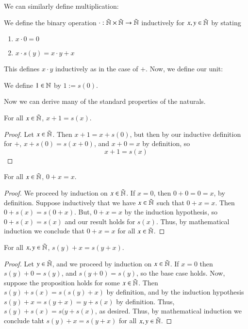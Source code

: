 We can similarly define multiplication:

\begin{defn}
    We define the binary operation $\cdot:\tilde{\mathbb N}\times\tilde{\mathbb N}\rightarrow\tilde{\mathbb N}$ inductively for $x,y \in \tilde{\mathbb N}$ by stating \begin{enumerate}
        \item $x \cdot 0 = 0$ 
        \item $x \cdot s(y) = x\cdot y + x$ 
    \end{enumerate}
\end{defn}

This defines $x\cdot y$ inductively as in the case of $+$. Now, we define our unit:
\begin{defn}
    We define $1 \in \mathbb N$ by $1 := s(0)$.
\end{defn}

Now we can derive many of the standard properties of the naturals.

\begin{prop}\label{prop:1.1.1}
    For all $x \in \tilde{\mathbb N}$, $x+1 = s(x)$.
\end{prop}
\begin{proof}
    Let $x \in \tilde{\mathbb N}$. Then $x + 1 = x+s(0)$, but then by our inductive definition for $+$, $x+s(0) = s(x+0)$, and $x+0 = x$ by definition, so $$x+1 = s(x)$$
\end{proof}

\begin{prop}\label{prop:1.1.2}
    For all $x \in \tilde{\mathbb N}$, $0+x = x$.
\end{prop}
\begin{proof}
    We proceed by induction on $x \in \tilde{\mathbb N}$. If $x = 0$, then $0 + 0 = 0 = x$, by definition. Suppose inductively that we have $x \in \tilde{\mathbb N}$ such that $0+x=x$. Then $0+s(x) = s(0+x)$. But, $0+x = x$ by the induction hypothesis, so $0+s(x) = s(x)$ and our result holds for $s(x)$. Thus, by mathematical induction we conclude that $0+x = x$ for all $x \in \tilde{\mathbb N}$.
\end{proof}

\begin{prop}\label{prop:1.1.3}
    For all $x,y \in \tilde{\mathbb N}$, $s(y) + x = s(y+x)$.
\end{prop}
\begin{proof}
    Let $y \in \tilde{\mathbb N}$, and we proceed by induction on $x \in \tilde{\mathbb N}$. If $x = 0$ then $s(y)+0 = s(y)$, and $s(y+0) = s(y)$, so the base case holds. Now, suppose the proposition holds for some $x \in \tilde{\mathbb N}$. Then $s(y) + s(x) = s(s(y) + x)$ by definition, and by the induction hypothesis $s(y) + x = s(y+x) = y+s(x)$ by definition. Thus, $s(y)+s(x) = s(y+s(x)$, as desired. Thus, by mathematical induction we conclude taht $s(y) + x = s(y+x)$ for all $x,y \in \tilde{\mathbb N}$.
\end{proof}

